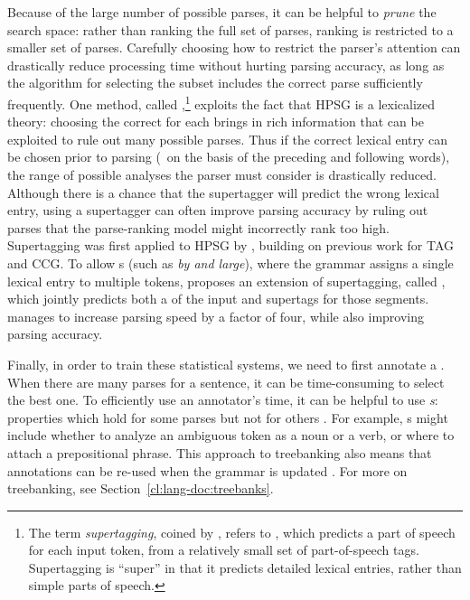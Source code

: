 \documentclass[output=paper,biblatex,babelshorthands,newtxmath,draftmode,colorlinks,citecolor=brown]{langscibook}
\begin{document}
Because of the large number of possible parses,
it can be helpful to \textit{prune} the search space:
rather than ranking the full set of parses,
ranking is restricted to a smaller set of parses.
Carefully choosing how to restrict the parser's attention 
can drastically reduce processing time without hurting parsing accuracy,
as long as the algorithm for selecting the subset
includes the correct parse sufficiently frequently.
One method, called \textit{},\footnote{%
	The term \textit{supertagging}, coined by \citet{bangalore1999supertag},
	refers to \textit{},
	which predicts a part of speech for each input token,
	from a relatively small set of part-of-speech tags.
	Supertagging is ``super'' in that it predicts detailed lexical entries,
	rather than simple parts of speech.
}
exploits the fact that HPSG is a lexicalized theory:
choosing the correct  for each  brings in rich information
that can be exploited to rule out many possible parses.
Thus if the correct lexical entry can be chosen prior to parsing
(\eg\ on the basis of the preceding and following words),
the range of possible analyses the parser must consider is drastically reduced.
Although there is a chance that the supertagger will predict the wrong lexical entry,
using a supertagger can often improve parsing accuracy
by ruling out parses that the parse-ranking model might incorrectly rank too high.
Supertagging was first applied to HPSG by \citet{matsuzaki2007supertag},
building on previous work for TAG \citep{bangalore1999supertag}
and CCG\indexccg \citep{clark2004supertag}.
To allow s (such as \textit{by and large}),
where the grammar assigns a single lexical entry to multiple tokens,
\citet{dridan2013ubertag} proposes an extension of supertagging, called \textit{},
which jointly predicts both a  of the input and supertags for those segments.
\citeauthor{dridan2013ubertag} manages to increase parsing speed by a factor of four,
while also improving parsing accuracy.


Finally, in order to train these statistical systems,
we need to first annotate a .
When there are many parses for a sentence,
it can be time-consuming to select the best one.
To efficiently use an annotator's time,
it can be helpful to use \textit{s}:
properties which hold for some parses but not for others \citep{Carter:97}.
For example, s might include
whether to analyze an ambiguous token as a noun or a verb,
or where to attach a prepositional phrase.
This approach to treebanking also means that
annotations can be re-used when the grammar is updated
\citep{OFTM2004a-u,Fli:Oep:Ben:17}.
For more on treebanking, see Section~\ref{cl:lang-doc:treebanks}.%
\end{document}
